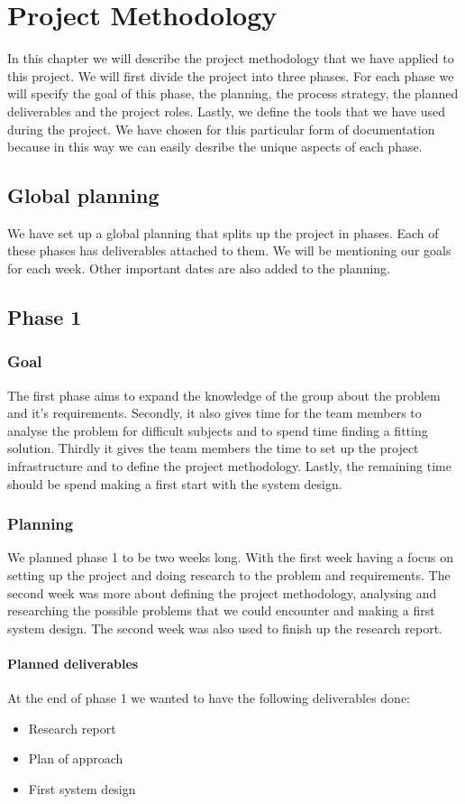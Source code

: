 \chapter{Project Methodology}
In this chapter we will describe the project methodology that we have applied to this project.
We will first divide the project into three phases.
For each phase we will specify the goal of this phase, the planning, the process strategy, the planned deliverables and the project roles.
Lastly, we define the tools that we have used during the project.
We have chosen for this particular form of documentation because in this way we can easily desribe the unique aspects of each phase.

\section{Global planning}
We have set up a global planning that splits up the project in phases.
Each of these phases has deliverables attached to them.
We will be mentioning our goals for each week.
Other important dates are also added to the planning.

\section{Phase 1}
\subsection{Goal}
The first phase aims to expand the knowledge of the group about the problem and it's requirements.
Secondly, it also gives time for the team members to analyse the problem for difficult subjects and to spend time finding a fitting solution.
Thirdly it gives the team members the time to set up the project infrastructure and to define the project methodology.
Lastly, the remaining time should be spend making a first start with the system design.

\subsection{Planning}
We planned phase 1 to be two weeks long.
With the first week having a focus on setting up the project and doing research to the problem and requirements.
The second week was more about defining the project methodology, analysing and researching the possible problems that we could encounter and making a first system design.
The second week was also used to finish up the research report.
\subsubsection{Planned deliverables}
At the end of phase 1 we wanted to have the following deliverables done:
\begin{itemize}
\item Research report
\item Plan of approach
\item First system design
\end{itemize}

